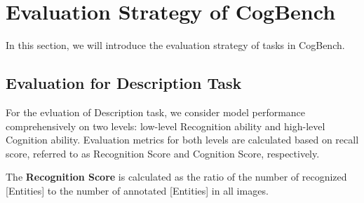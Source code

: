 \section{Evaluation Strategy of CogBench}

In this section, we will introduce the evaluation strategy of tasks in CogBench.

\subsection{Evaluation for Description Task}

For the evluation of Description task, we consider model performance comprehensively on two levels: low-level Recognition ability and high-level Cognition ability. 
Evaluation metrics for both levels are calculated based on recall score, referred to as Recognition Score and Cognition Score, respectively.

The \textbf{Recognition Score} is calculated as the ratio of the number of recognized [Entities] to the number of annotated [Entities] in all images.

